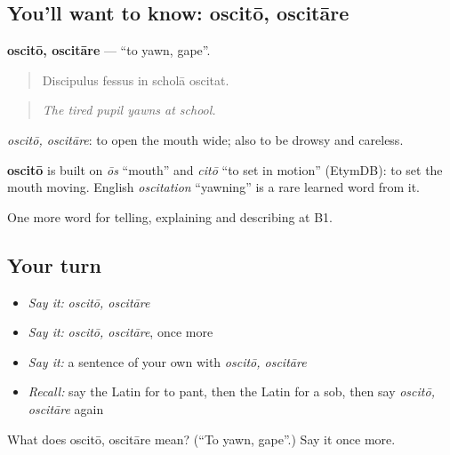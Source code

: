 \subsection*{You'll want to know: oscitō, oscitāre}
\textbf{oscitō, oscitāre} — \textquotedblleft{}to yawn, gape\textquotedblright{}.

\begin{quote}
Discipulus fessus in scholā oscitat.
\end{quote}

\begin{quote}
\emph{The tired pupil yawns at school.}
\end{quote}

\emph{oscitō, oscitāre}: to open the mouth wide; also to be drowsy and careless.

\begin{cousinweb}
\textbf{oscitō} is built on \emph{ōs} \textquotedblleft{}mouth\textquotedblright{} and \emph{citō} \textquotedblleft{}to set in motion\textquotedblright{} (EtymDB): to set the mouth moving. English \emph{oscitation} \textquotedblleft{}yawning\textquotedblright{} is a rare learned word from it.
\end{cousinweb}

\begin{grammarlens}[title={What you've built}]
One more word for telling, explaining and describing at B1.
\end{grammarlens}

\subsection*{Your turn}
\begin{itemize}
\raggedright
  \item \emph{Say it:} \emph{oscitō, oscitāre}
  \item \emph{Say it:} \emph{oscitō, oscitāre}, once more
  \item \emph{Say it:} a sentence of your own with \emph{oscitō, oscitāre}
  \item \emph{Recall:} say the Latin for to pant, then the Latin for a sob, then say \emph{oscitō, oscitāre} again
\end{itemize}

\begin{tcolorbox}[breakable,colback=teal!4,colframe=teal!35!black,title={Before you move on}]
What does oscitō, oscitāre mean? (\textquotedblleft{}To yawn, gape\textquotedblright{}.) Say it once more.
\end{tcolorbox}
